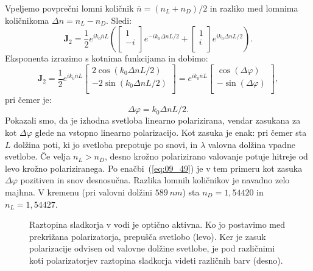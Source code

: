 Vpeljemo povprečni lomni količnik $\overline{n} = (n_L + n_D)/2$ in razliko
med lomnima količnikoma $\Delta n = n_L-n_D$. Sledi:
\begin{equation}
\mathbf{J}_{2}  = \frac{1}{2} e^{ik_0\overline{n} L}
\left(
\left[\begin{array}{c}
1\\
-i\\
\end{array}\right]e^{-ik_0 \Delta n L/2}+
\left[\begin{array}{c}
1\\
i\\
\end{array}\right]e^{ik_0\Delta n L/2}
\right)\!\!.
\label{eq:09_46}
\end{equation}
Eksponenta izrazimo s kotnima funkcijama in dobimo:
\begin{equation}
\mathbf{J}_{2}  = \frac{1}{2} e^{ik_0\overline{n} L}
\left[\begin{array}{c}
2 \cos(k_0 \Delta n L/2)\\
-2 \sin(k_0 \Delta n L/2)\\
\end{array}\right] = 
e^{ik_0\overline{n} L}
\left[\begin{array}{c}
\cos(\Delta \varphi)\\
-\sin(\Delta \varphi)\\
\end{array}\right]\!\!,
\label{eq:09_47}
\end{equation}
pri čemer je:
\begin{equation}
\Delta \varphi = k_0 \Delta n L/2.
\label{eq:09_48}
\end{equation}
Pokazali smo, da je izhodna svetloba linearno polarizirana, vendar zasukana za kot 
$\Delta \varphi$ glede na vstopno linearno polarizacijo. Kot zasuka je enak:
pri čemer sta $L$ dolžina poti, ki jo svetloba prepotuje po snovi, in $\lambda$ valovna
dolžina vpadne svetlobe. 
Če velja $n_L>n_D$, desno krožno polarizirano valovanje potuje
hitreje od levo krožno polariziranega. Po enačbi~(\ref{eq:09_49}) je v tem primeru kot 
zasuka $\Delta \varphi$ pozitiven in snov desnosučna. 
Razlika lomnih količnikov je navadno zelo majhna. V kremenu (pri 
valovni dolžini $589~\si{nm}$) sta $n_D = 1,54420$ in $n_L = 1,54427$.
\begin{figure}[ht]
\centering
\def\svgwidth{140truemm} 

\caption{Raztopina sladkorja v vodi je optično aktivna. Ko jo postavimo med prekrižana
polarizatorja, prepušča svetlobo (levo). Ker je zasuk polarizacije odvisen od valovne dolžine
svetlobe, je pod različnimi koti polarizatorjev raztopina sladkorja videti različnih barv (desno).}
\label{fig:09_aktivnost-foto}
\end{figure}

